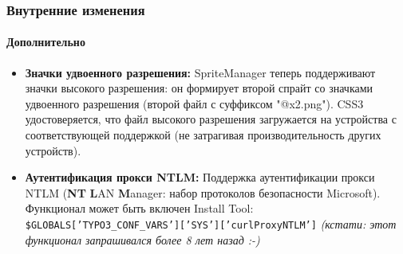 \begin{frame}[fragile]
	\frametitle{Внутренние изменения}
	\framesubtitle{Дополнительно}

	\begin{itemize}

		\item \textbf{Значки удвоенного разрешения:}\newline
			\small
				SpriteManager теперь поддерживают значки высокого разрешения: он формирует второй спрайт со значками удвоенного
				 разрешения (второй файл с суффиксом "@x2.png"). CSS3 удостоверяется, что файл высокого разрешения загружается на устройства с соответствующей поддержкой\newline
				(не затрагивая производительность других устройств).
			\normalsize

		\item \textbf{Аутентификация прокси NTLM:}\newline
			\small
				Поддержка аутентификации прокси NTLM (\textbf{NT} \textbf{L}AN \textbf{M}anager: набор протоколов безопасности Microsoft).  Функционал может быть включен Install Tool:\newline
				\normalsize
				\smaller
					\texttt{\$GLOBALS['TYPO3\_CONF\_VARS']['SYS']['curlProxyNTLM']}\newline
				\emph{(кстати: этот функционал запрашивался более 8 лет назад :-)}
			\normalsize

	\end{itemize}

\end{frame}


